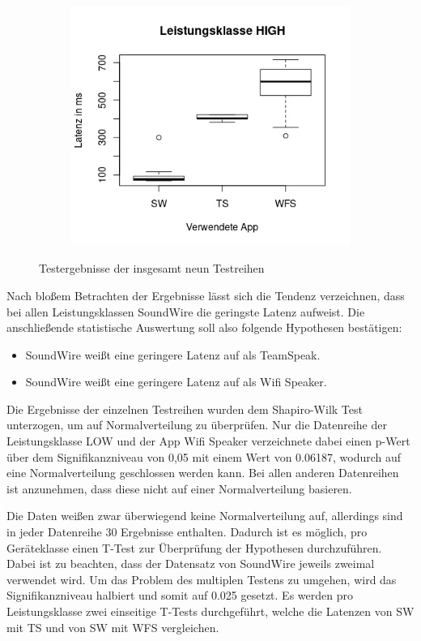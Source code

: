 \begin{figure}[H]
\begin{subfigure}[b]{0.5\textwidth}
\end{subfigure}
\begin{subfigure}[b]{0.5\textwidth}
\includegraphics[width=\textwidth]{img/boxplothigh.png}
\end{subfigure}
\caption{Testergebnisse der insgesamt neun Testreihen}
\label{boxplots}
\end{figure}

Nach bloßem Betrachten der Ergebnisse lässt sich die Tendenz verzeichnen, dass bei allen Leistungsklassen SoundWire die geringste Latenz aufweist. Die anschließende statistische Auswertung soll also folgende Hypothesen bestätigen:

\begin{itemize}
\item SoundWire weißt eine geringere Latenz auf als TeamSpeak.
\item SoundWire weißt eine geringere Latenz auf als Wifi Speaker.
\end{itemize}

Die Ergebnisse der einzelnen Testreihen wurden dem Shapiro-Wilk Test unterzogen, um auf Normalverteilung zu überprüfen. Nur die Datenreihe der Leistungsklasse LOW und der App Wifi Speaker verzeichnete dabei einen p-Wert über dem Signifikanzniveau von 0,05 mit einem Wert von 0.06187, wodurch auf eine Normalverteilung geschlossen werden kann. Bei allen anderen Datenreihen ist anzunehmen, dass diese nicht auf einer Normalverteilung basieren.

Die Daten weißen zwar überwiegend keine Normalverteilung auf, allerdings sind in jeder Datenreihe 30 Ergebnisse enthalten. Dadurch ist es möglich, pro Geräteklasse einen T-Test zur Überprüfung der Hypothesen durchzuführen. Dabei ist zu beachten, dass der Datensatz von SoundWire jeweils zweimal verwendet wird. Um das Problem des multiplen Testens zu umgehen, wird das Signifikanzniveau halbiert und somit auf 0.025 gesetzt. Es werden pro Leistungsklasse zwei einseitige T-Tests durchgeführt, welche die Latenzen von SW mit TS und von SW mit WFS vergleichen.

